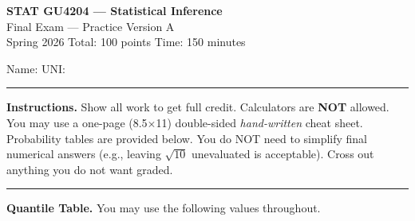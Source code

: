 \documentclass[11pt]{article}
\begin{document}

\begin{center}
{\LARGE\bfseries STAT GU4204 --- Statistical Inference}\\[6pt]
{\Large Final Exam --- Practice Version A}\\[6pt]
{\large Spring 2026 \hspace{1.5cm} Total: 100 points \hspace{1.5cm} Time: 150 minutes}
\end{center}

\medskip

Name: \underline{\hspace{3.5in}} \hspace{0.5cm} UNI: \underline{\hspace{1.5in}}

\medskip
\hrule
\medskip

\textbf{Instructions.} Show all work to get full credit. Calculators are \textbf{NOT} allowed. You may use a one-page (8.5$\times$11) double-sided \emph{hand-written} cheat sheet. Probability tables are provided below. You do NOT need to simplify final numerical answers (e.g., leaving $\sqrt{10}$ unevaluated is acceptable). Cross out anything you do not want graded.

\medskip
\hrule
\medskip

\textbf{Quantile Table.} You may use the following values throughout.
\end{document}
